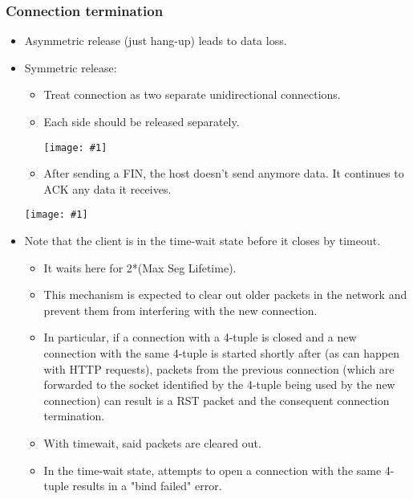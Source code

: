 \documentclass{report}
\makeatletter
\def\maxwidth#1{\ifdim\Gin@nat@width>#1 #1\else\Gin@nat@width\fi}
\newcommand{\mygraphic}[1]{
\begin{center}
    \texttt{[image: \#1]}
\end{center}
}
\makeatother
\begin{document}
\subsubsection{Connection termination}
\begin{itemize}
\item Asymmetric release (just hang-up) leads to data loss.
\item Symmetric release:
\begin{itemize}
\item Treat connection as two separate unidirectional connections.
\item Each side should be released separately.
\mygraphic{rsrc/tcpfinack.png}
\item After sending a FIN, the host doesn't send anymore data. It continues to ACK any data it receives.
\end{itemize}
\mygraphic{rsrc/tcpstate.png}
\item Note that the client is in the time-wait state before it closes by timeout.
\begin{itemize}
    \item It waits here for 2*(Max Seg Lifetime).
    \item This mechanism is expected to clear out older packets in the network and prevent them from interfering with the new connection.
    \item In particular, if a connection with a 4-tuple is closed and a new connection with the same 4-tuple is started shortly after (as can happen with HTTP requests), packets from the previous connection (which are forwarded to the socket identified by the 4-tuple being used by the new connection) can result is a RST packet and the consequent connection termination.
    \item With timewait, said packets are cleared out.
    \item In the time-wait state, attempts to open a connection with the same 4-tuple results in a "bind failed" error.
\end{itemize}
\end{itemize}
\end{document}
